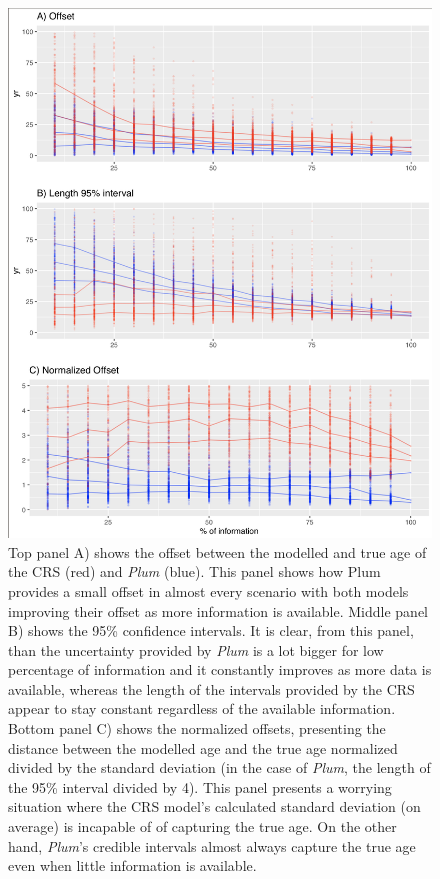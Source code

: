 \documentclass [10pt] {article}
\begin{document}
\begin{figure}[!]
 \centering
  \includegraphics[width=.75\linewidth]{AccPrec.png}
	\caption{Top panel A) shows the offset between the modelled and true age of the CRS (red) and \textit{Plum} (blue). This panel shows how Plum provides a small offset in almost every scenario with both models improving their offset as more information is available. Middle panel B) shows the 95\% confidence intervals. It is clear, from this panel, than the uncertainty provided by \textit{Plum} is a lot bigger for low percentage of information and it constantly improves as more data is available, whereas the length of the intervals provided by the CRS appear to stay constant regardless of the available information. Bottom panel C) shows the normalized offsets, presenting the distance between the modelled age and the true age normalized divided by the standard deviation (in the case of \textit{Plum}, the length of the 95\% interval divided by 4). This panel presents a worrying situation where the CRS model's calculated standard deviation (on average) is incapable of of capturing the true age. On the other hand, \textit{Plum}'s credible intervals almost always capture the true age even when little information is available.}
  \label{fig:accpre}
\end{figure}
\end{document}
